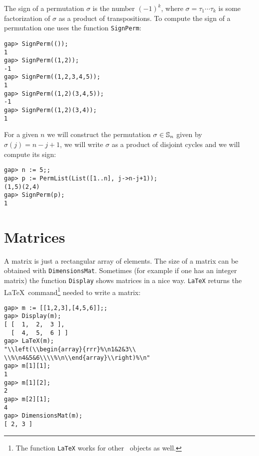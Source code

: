 The sign of a permutation $\sigma$ is the number $(-1)^k$, where
$\sigma=\tau_1\cdots\tau_k$ is some factorization of $\sigma$ as a product of
transpositions. To compute the sign of a permutation one uses the function
\lstinline{SignPerm}:
\begin{lstlisting}
gap> SignPerm(());                                                    
1
gap> SignPerm((1,2));
-1
gap> SignPerm((1,2,3,4,5));
1
gap> SignPerm((1,2)(3,4,5));
-1
gap> SignPerm((1,2)(3,4));
1
\end{lstlisting}

\begin{example}
For a given $n$ we will construct the permutation $\sigma\in\mathbb{S}_n$ given by
$\sigma(j)=n-j+1$, we will write $\sigma$ as a product of disjoint cycles and
we will compute its sign:
\begin{lstlisting}
gap> n := 5;;
gap> p := PermList(List([1..n], j->n-j+1));
(1,5)(2,4)
gap> SignPerm(p);
1
\end{lstlisting}
\end{example}

\section{Matrices}
\label{matrices}

A matrix is just a rectangular array of elements.  The size of a
matrix can be obtained with \lstinline{DimensionsMat}.  Sometimes (for example
if one has an integer matrix) the function \lstinline{Display} shows matrices
in a nice way.  \lstinline{LaTeX} returns the \LaTeX~command\footnote{The
function \lstinline{LaTeX} works for other \GAP~objects as well.} needed to
write a matrix:
\begin{lstlisting}
gap> m := [[1,2,3],[4,5,6]];;                                         
gap> Display(m);
[ [  1,  2,  3 ],
  [  4,  5,  6 ] ]
gap> LaTeX(m);
"\\left(\\begin{array}{rrr}%\n1&2&3\\
\\%\n4&5&6\\\\%\n\\end{array}\\right)%\n"
gap> m[1][1];
1
gap> m[1][2];
2
gap> m[2][1];
4
gap> DimensionsMat(m);
[ 2, 3 ]
\end{lstlisting}

